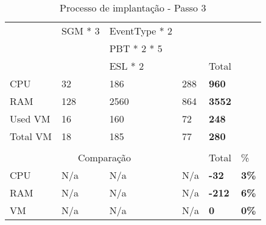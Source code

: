 \begin{table}[H]
\begin{tabular}{|l|l|l|l|l|l|}
                                     & \cellcolor[HTML]{BDD7EE}SGM * 3             & \cellcolor[HTML]{A9D08E}EventType * 2                &            &                              & \\ \cline{1-5}
                                     &                                             & \cellcolor[HTML]{A9D08E}PBT * 2 * 5                                            &              &                              & \\ \cline{1-5}
                                     &                                             & \cellcolor[HTML]{A9D08E}ESL * 2 &                 & Total & \\ \cline{1-5}
    \cellcolor[HTML]{C0C0C0}CPU      & 32                                          & 186                                        & 288                                          & \textbf{960}                 & \\ \cline{1-5}
    \cellcolor[HTML]{C0C0C0}RAM      & 128                                         & 2560                                       & 864                                          & \textbf{3552}                & \\ \cline{1-5}
    \cellcolor[HTML]{C0C0C0}Used VM  & 16                                          & 160                                        & 72                                           & \textbf{248}                 & \\ \cline{1-5}
    \cellcolor[HTML]{C0C0C0}Total VM & 18                                          & 185                                        & 77                                           & \textbf{280}                 & \\ \cline{1-5}
      &                                              &                                              &               &               & \\ \cline{1-6}
    \multicolumn{4}{c}{\cellcolor[HTML]{C0C0C0}Comparação}                       & Total         & \%             \\ \cline{1-6}
    \cellcolor[HTML]{C0C0C0}CPU                             & N/a                                                    & N/a                                                    & N/a & \textbf{-32} & \textbf{3\%} \\ \cline{1-6}
    \cellcolor[HTML]{C0C0C0}RAM                             & N/a                                                    & N/a                                                    & N/a    & \textbf{-212}    & \textbf{6\%} \\ \cline{1-6}
    \cellcolor[HTML]{C0C0C0}VM                              & N/a                                                    & N/a                                                    & N/a    & \textbf{0}    & \textbf{0\%} \\ \cline{1-6}
  \end{tabular}
  \caption{Processo de implantação - Passo 3}
  \label{tab:strat-3}
\end{table}

